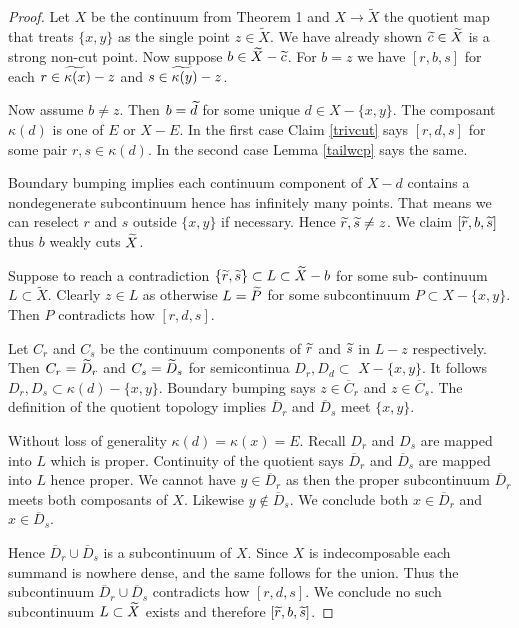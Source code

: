 \documentclass[12pt]{article}
\theoremstyle{plain}
\theoremstyle{definition}
\newcounter{claim5counter}
\newcommand{\K}{\ensuremath{\kappa}}
\newcommand{\0}{\ensuremath{\varnothing}}
\newcommand{\tl}{\ensuremath{\widetilde}}
\newcommand{\wt}{\ensuremath{\widetilde}}
\begin{document}
	\begin{proof}
		Let $X$ be the continuum from Theorem 1 and $X \to \widetilde X$ the quotient map that treats $\{x,y\}$ as the single point $z \in \widetilde X$.
		We have already shown $\tl c \in \widetilde X$ is a strong non-cut point.
		Now suppose $b \in \widetilde X- \tl c$.
		For $b=z$ we have $[r,b,s]$ for each $r \in \tl{\K(x}) -z$ and $s \in \tl{\K(y}) -z$.
		
		
		Now assume $b \ne z$.
		Then $b = \wt d$ for some unique $d \in X - \{x,y\}$.
		The composant $\K(d)$ is one of $E$ or $X-E$.
		In the first case Claim \ref{trivcut} says $[r,d,s]$ for some pair $r,s \in \K(d)$.
		In the second case Lemma \ref{tailwcp} says the same.
		
		Boundary bumping implies each continuum component of $X- d$ contains a nondegenerate subcontinuum hence has infinitely many points.
		That means we can reselect $r$ and $s$ outside $\{x,y\}$ if necessary.
		Hence $\wt r,\wt s \ne z$.
		We claim $[\wt r,b,\wt s]$ thus $b$ weakly cuts $\wt X$.
		
		Suppose to reach a contradiction $\{\wt r,\wt s\} \subset L \subset \widetilde X - b$ for some sub- continuum $L \subset \widetilde X$.
		Clearly $z \in L$ as otherwise $L = \wt P$ for some subcontinuum \mbox{$P \subset X - \{x,y\}$}.
		Then $P$ contradicts how $[r,d,s]$.
		
		Let $C_r$ and $C_s$ be the continuum components of $\wt r$ and $\wt s$ in $L - z$ respectively.
		Then $C_r = \wt D_r$ and $C_s = \wt D_s$  for semicontinua $D_r, D_d \subset $ $X - \{x,y\}$.
		It follows $D_r,D_s \subset \K(d)-\{x,y\}$.
		Boundary bumping says $z \in \overline C_r$ and $z \in \overline C_s$.
		The definition of the quotient topology implies $\overline D_r$ and $\overline D_s$ meet $\{x,y\}$.
		
		Without loss of generality $\K(d)=\K(x) = E$.
		Recall $D_r$ and $D_s$ are mapped into $L$ which is proper.
		Continuity of the quotient says $\overline D_r$ and $\overline D_s$ are mapped into $L$ hence proper.
		We cannot have $y \in \overline D_r$ as then the proper subcontinuum $\overline D_r$ meets both composants of $X$.
		Likewise $y \notin \overline D_s$.
		We conclude both $x \in \overline D_r$ and $ x \in \overline D_s$.
		
		Hence $\overline D_r \cup  \overline D_s$ is a subcontinuum of $X$.
		Since $X$ is indecomposable each summand is nowhere dense, and the same follows for the union.
		Thus the subcontinuum $\overline D_r \cup  \overline D_s$ contradicts how $[r,d,s]$.
		We conclude no such subcontinuum $L \subset \wt X$ exists and therefore $[\wt r,b,\wt s]$.
	\end{proof}
	
\end{document}
